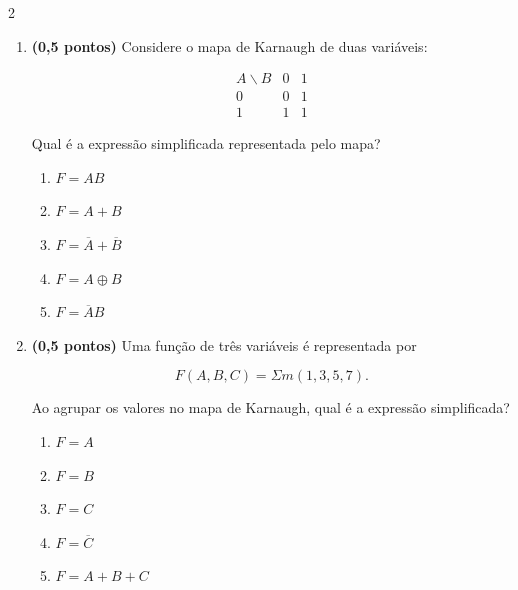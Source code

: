 \documentclass[a4paper,12pt]{article}
\begin{document}
\begin{multicols}{2}
\begin{enumerate}[leftmargin=*]
\vspace{0.2cm}


\item \textbf{(0,5 pontos)} Considere o mapa de Karnaugh de duas variáveis:

\[
\begin{array}{c|cc}
A\backslash B & 0 & 1 \\ \hline
0 & 0 & 1 \\
1 & 1 & 1
\end{array}
\]

Qual é a expressão simplificada representada pelo mapa?

\begin{enumerate}[label=(\Alph*)]
    \item $F=AB$
    \item $F=A+B$
    \item $F=\overline{A}+\overline{B}$
    \item $F=A\oplus B$
    \item $F=\overline{A}B$
\end{enumerate}

\vspace{0.2cm}


\item \textbf{(0,5 pontos)} Uma função de três variáveis é representada por

\[
F(A,B,C)=\Sigma m(1,3,5,7).
\]

Ao agrupar os valores no mapa de Karnaugh, qual é a expressão simplificada?

\begin{enumerate}[label=(\Alph*)]
    \item $F=A$
    \item $F=B$
    \item $F=C$
    \item $F=\overline{C}$
    \item $F=A+B+C$
\end{enumerate}

\vspace{0.2cm}



\end{enumerate}
\end{multicols}
\end{document}
